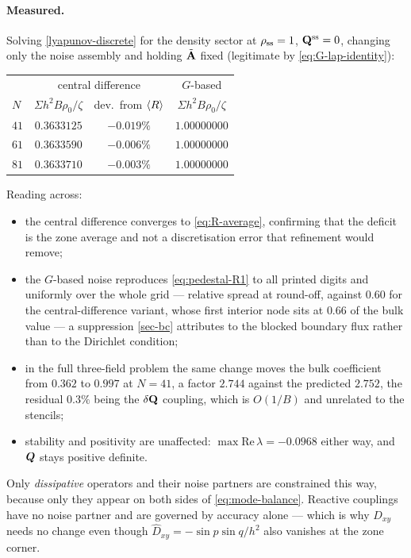 \documentclass[a5paper]{article}
\begin{document}
\paragraph{Measured.} Solving \eqref{lyapunov-discrete} for the density sector at $\rho_\ss=1$, $\Q^\ss=0$, changing only the noise assembly and holding $\tilde\A$ fixed (legitimate by \eqref{eq:G-lap-identity}):

\begin{center}
\footnotesize
\begin{tabular}{lccc}
\hline
 & \multicolumn{2}{c}{central difference} & $G$-based \\
$N$ & $\Sigma h^2B\rho_0/\zeta$ & dev.\ from $\la R\ra$ & $\Sigma h^2B\rho_0/\zeta$ \\
\hline
$41$ & $0.3633125$ & $-0.019\%$ & $1.00000000$ \\
$61$ & $0.3633590$ & $-0.006\%$ & $1.00000000$ \\
$81$ & $0.3633710$ & $-0.003\%$ & $1.00000000$ \\
\hline
\end{tabular}
\end{center}

\noindent Reading across:
\begin{itemize}
    \item the central difference converges to \eqref{eq:R-average}, confirming that the deficit is the zone average and not a discretisation error that refinement would remove;
    \item the $G$-based noise reproduces \eqref{eq:pedestal-R1} to all printed digits and uniformly over the whole grid --- relative spread at round-off, against $0.60$ for the central-difference variant, whose first interior node sits at $0.66$ of the bulk value --- a suppression \cref{sec-bc} attributes to the blocked boundary flux rather than to the Dirichlet condition;
    \item in the full three-field problem the same change moves the bulk coefficient from $0.362$ to $0.997$ at $N=41$, a factor $2.744$ against the predicted $2.752$, the residual $0.3\%$ being the $\delta\Q$ coupling, which is $O(1/B)$ and unrelated to the stencils;
    \item stability and positivity are unaffected: $\max\mathrm{Re}\,\lambda = -0.0968$ either way, and $\bs Q$ stays positive definite.
\end{itemize}

Only \emph{dissipative} operators and their noise partners are constrained this way, because only they appear on both sides of \eqref{eq:mode-balance}. Reactive couplings have no noise partner and are governed by accuracy alone --- which is why $D_{xy}$ needs no change even though $\hat D_{xy} = -\sin p\sin q/h^2$ also vanishes at the zone corner.
\end{document}
